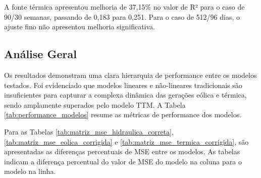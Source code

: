 A fonte térmica apresentou melhoria de 37,15\% no valor de R² para o caso de 90/30 semanas, passando de 0,183 para 0,251.
Para o caso de 512/96 dias, o ajuste fino não apresentou melhoria significativa. 

\subsection{Análise Geral}
Os resultados demonstram uma clara hierarquia de performance entre os modelos testados. Foi evidenciado que modelos 
lineares e não-lineares tradicionais são insuficientes para capturar a complexa dinâmica das gerações eólica e térmica, sendo 
amplamente superados pelo modelo TTM. A Tabela \ref{tab:performance_modelos} resume as métricas de performance dos modelos.

\begin{table}[htb]
  \centering
\end{table}

Para as Tabelas \ref{tab:matriz_mse_hidraulica_correta}, \ref{tab:matriz_mse_eolica_corrigida} e \ref{tab:matriz_mse_termica_corrigida},
são apresentadas as diferenças percentuais de MSE entre os modelos. As tabelas indicam a diferença percentual do valor de
MSE do modelo na coluna para o modelo na linha.

